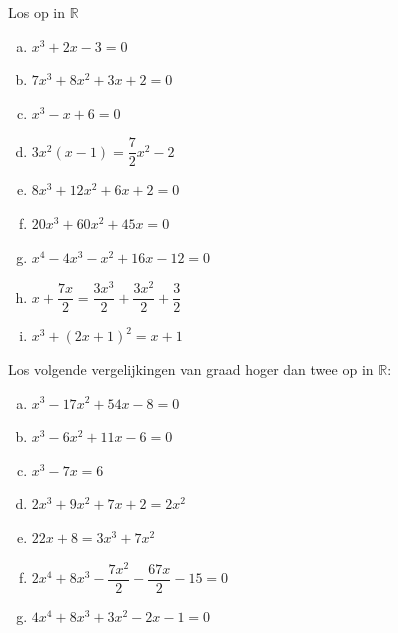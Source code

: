 \documentclass[12pt]{article}
\begin{document}
\begin{theorie}
\end{theorie}

\begin{oefening}
  Los op in $\mathbb{R}$
  \begin{multicols}{2}
    \begin{enumerate}[(a)]
    \itemsep0.7em
    \item $x^3+2x-3=0$
    \item $7x^3+8x^2+3x+2=0$
    \item $x^3-x+6=0$
    \item $3x^2(x-1)=\dfrac{7}{2}x^2-2$
    \item $8x^3+12x^2+6x+2=0$
    \item $20x^3+60x^2+45x=0$
    \item $x^4-4x^3-x^2+16x-12=0$
    \item $x+\dfrac{7x}{2}=\dfrac{3x^3}{2}+\dfrac{3x^2}{2}+\dfrac{3}{2}$
    \item $x^3+(2x+1)^2=x+1$
    \end{enumerate}
  \end{multicols}
\end{oefening}

\begin{oefening} %
  Los volgende vergelijkingen van graad hoger dan twee op in $\mathbb{R}$:
  \begin{enumerate}[(a)]
  \itemsep.7em
  \item $x^3-17x^2+54x-8=0$
  \item $x^3-6x^2+11x-6=0$
  \item $x^3-7x=6$
  \item $2x^3+9x^2+7x+2=2x^2$
  \item $22x+8=3x^3+7x^2$
  \item $2x^4+8x^3-\dfrac{7x^2}{2}-\dfrac{67x}{2}-15=0$
  \item $4x^4+8x^3+3x^2-2x-1=0$
  \end{enumerate}
\end{oefening}
\end{document}
